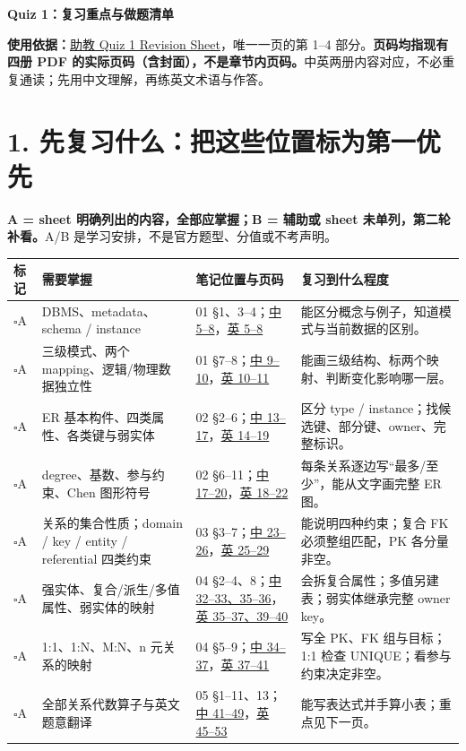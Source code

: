 \documentclass[11pt,a4paper]{article}
\newcommand{\ck}{\(\square\)\;}
\newcommand{\zhp}[1]{\href{notes_zh.pdf}{中 #1}}
\newcommand{\enp}[1]{\href{notes_en.pdf}{英 #1}}
\begin{document}
{\sffamily\LARGE\bfseries\color{CUHKPurple}Quiz 1：复习重点与做题清单}\par
\textbf{使用依据：}\href{../Quiz_1_Revision_Sheet(1)(1).pdf}{助教 Quiz 1 Revision Sheet}，唯一一页的第 1--4 部分。\textbf{页码均指现有四册 PDF 的实际页码（含封面），不是章节内页码。}中英两册内容对应，不必重复通读；先用中文理解，再练英文术语与作答。

\section{1. 先复习什么：把这些位置标为第一优先}
\textbf{A = sheet 明确列出的内容，全部应掌握；B = 辅助或 sheet 未单列，第二轮补看。}A/B 是学习安排，不是官方题型、分值或不考声明。

{\small\begin{longtable}{@{}p{.08\linewidth}p{.33\linewidth}p{.23\linewidth}p{.27\linewidth}@{}}
\toprule 标记 & 需要掌握 & 笔记位置与页码 & 复习到什么程度 \\
\midrule\endhead
\ck A & DBMS、metadata、schema / instance & 01 §1、3--4；\zhp{5--8}，\enp{5--8} & 能区分概念与例子，知道模式与当前数据的区别。\\
\ck A & 三级模式、两个 mapping、逻辑/物理数据独立性 & 01 §7--8；\zhp{9--10}，\enp{10--11} & 能画三级结构、标两个映射、判断变化影响哪一层。\\
\ck A & ER 基本构件、四类属性、各类键与弱实体 & 02 §2--6；\zhp{13--17}，\enp{14--19} & 区分 type / instance；找候选键、部分键、owner、完整标识。\\
\ck A & degree、基数、参与约束、Chen 图形符号 & 02 §6--11；\zhp{17--20}，\enp{18--22} & 每条关系逐边写“最多/至少”，能从文字画完整 ER 图。\\
\ck A & 关系的集合性质；domain / key / entity / referential 四类约束 & 03 §3--7；\zhp{23--26}，\enp{25--29} & 能说明四种约束；复合 FK 必须整组匹配，PK 各分量非空。\\
\ck A & 强实体、复合/派生/多值属性、弱实体的映射 & 04 §2--4、8；\zhp{32--33、35--36}，\enp{35--37、39--40} & 会拆复合属性；多值另建表；弱实体继承完整 owner key。\\
\ck A & 1:1、1:N、M:N、n 元关系的映射 & 04 §5--9；\zhp{34--37}，\enp{37--41} & 写全 PK、FK 组与目标；1:1 检查 UNIQUE；看参与约束决定非空。\\
\ck A & 全部关系代数算子与英文题意翻译 & 05 §1--11、13；\zhp{41--49}，\enp{45--53} & 能写表达式并手算小表；重点见下一页。\\
\bottomrule
\end{longtable}}
\end{document}

